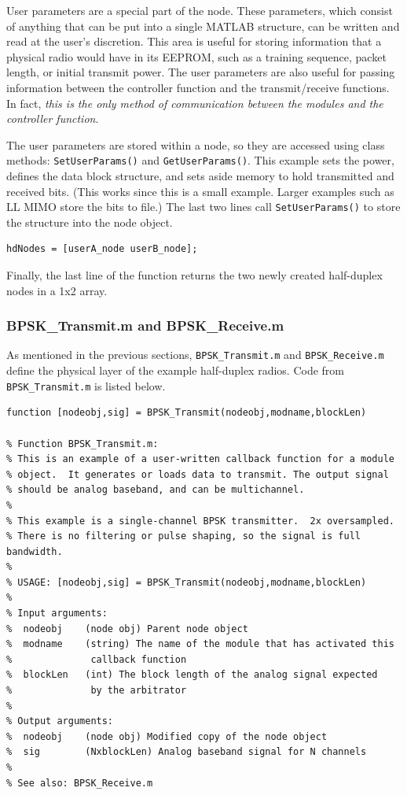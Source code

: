 User parameters are a special part of the node.  These parameters,
which consist of anything that can be put into a single MATLAB
structure, can be written and read at the user's discretion.  This
area is useful for storing information that a physical radio would
have in its EEPROM, such as a training sequence, packet length, or
initial transmit power.  The user parameters are also useful for
passing information between the controller function and the
transmit/receive functions.  In fact, \emph{this is the only method
of communication between the modules and the controller function}.

The user parameters are stored within a node, so they are accessed
using class methods:  \verb+SetUserParams()+ and
\verb+GetUserParams()+. This example sets the power, defines the
data block structure, and sets aside memory to hold transmitted and
received bits.  (This works since this is a small example.  Larger
examples such as LL MIMO store the bits to file.)  The last two
lines call \verb+SetUserParams()+ to store the structure into the
node object.

\begin{lstlisting}[name=hdBuildNodes]
% Put user nodes into array
hdNodes = [userA_node userB_node];
\end{lstlisting}

Finally, the last line of the function returns the two newly created
half-duplex nodes in a 1x2 array.

\subsubsection{BPSK\_Transmit.m and BPSK\_Receive.m}

As mentioned in the previous sections, \verb+BPSK_Transmit.m+ and
\verb+BPSK_Receive.m+ define the physical layer of the example
half-duplex radios.  Code from \verb+BPSK_Transmit.m+ is listed
below.

\begin{lstlisting}[name=bpskTx]
function [nodeobj,sig] = BPSK_Transmit(nodeobj,modname,blockLen)

% Function BPSK_Transmit.m:
% This is an example of a user-written callback function for a module
% object.  It generates or loads data to transmit. The output signal 
% should be analog baseband, and can be multichannel.
%
% This example is a single-channel BPSK transmitter.  2x oversampled.
% There is no filtering or pulse shaping, so the signal is full bandwidth.
%
% USAGE: [nodeobj,sig] = BPSK_Transmit(nodeobj,modname,blockLen)
%
% Input arguments:
%  nodeobj    (node obj) Parent node object
%  modname    (string) The name of the module that has activated this
%              callback function
%  blockLen   (int) The block length of the analog signal expected
%              by the arbitrator
%
% Output arguments:
%  nodeobj    (node obj) Modified copy of the node object
%  sig        (NxblockLen) Analog baseband signal for N channels
%
% See also: BPSK_Receive.m
\end{lstlisting}

